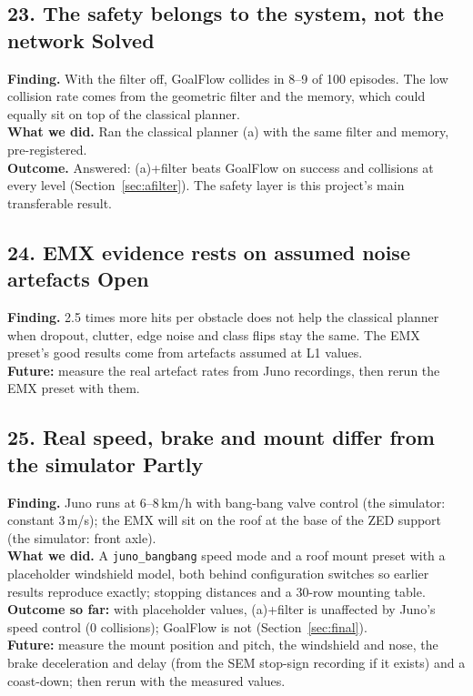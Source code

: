 \documentclass[11pt,a4paper]{article}
\newcommand{\code}[1]{\texttt{#1}}
\newcommand{\solved}{\textcolor{okc}{\textbf{Solved}}}
\newcommand{\partly}{\textcolor{accent}{\textbf{Partly}}}
\newcommand{\open}{\textcolor{warn}{\textbf{Open}}}
\begin{document}
\subsection*{23. The safety belongs to the system, not the network \hfill\solved}
\textbf{Finding.} With the filter off, GoalFlow collides in 8--9 of 100 episodes. The low collision rate comes from
the geometric filter and the memory, which could equally sit on top of the classical planner.\\
\textbf{What we did.} Ran the classical planner (a) with the same filter and memory, pre-registered.\\
\textbf{Outcome.} Answered: (a)+filter beats GoalFlow on success and collisions at every level
(Section~\ref{sec:afilter}). The safety layer is this project's main transferable result.

\subsection*{24. EMX evidence rests on assumed noise artefacts \hfill\open}
\textbf{Finding.} 2.5 times more hits per obstacle does not help the classical planner when dropout, clutter, edge
noise and class flips stay the same. The EMX preset's good results come from artefacts assumed at L1 values.\\
\textbf{Future:} measure the real artefact rates from Juno recordings, then rerun the EMX preset with them.

\subsection*{25. Real speed, brake and mount differ from the simulator \hfill\partly}
\textbf{Finding.} Juno runs at 6--8\,km/h with bang-bang valve control (the simulator: constant 3\,m/s); the EMX will sit
on the roof at the base of the ZED support (the simulator: front axle).\\
\textbf{What we did.} A \code{juno\_bangbang} speed mode and a roof mount preset with a placeholder windshield model,
both behind configuration switches so earlier results reproduce exactly; stopping distances and a 30-row mounting
table.\\
\textbf{Outcome so far:} with placeholder values, (a)+filter is unaffected by Juno's speed control (0 collisions);
GoalFlow is not (Section~\ref{sec:final}).\\
\textbf{Future:} measure the mount position and pitch, the windshield and nose, the brake deceleration and delay
(from the SEM stop-sign recording if it exists) and a coast-down; then rerun with the measured values.
\end{document}
